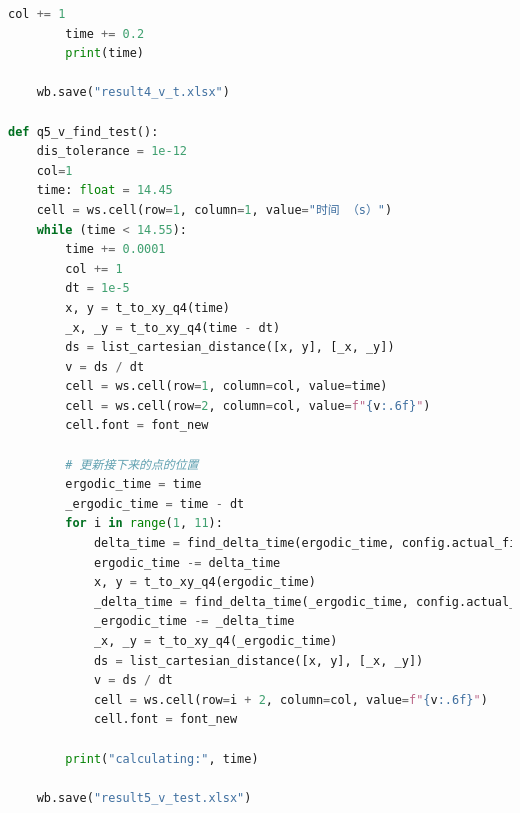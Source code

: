\documentclass[a4paper]{article}
\begin{document}
\begin{lstlisting}[language=python,columns=fullflexible,frame=shadowbox]
		col += 1
		time += 0.2
		print(time)
	
	wb.save("result4_v_t.xlsx")

def q5_v_find_test():
	dis_tolerance = 1e-12
	col=1
	time: float = 14.45
	cell = ws.cell(row=1, column=1, value="时间 （s）")
	while (time < 14.55):
		time += 0.0001
		col += 1
		dt = 1e-5
		x, y = t_to_xy_q4(time)
		_x, _y = t_to_xy_q4(time - dt)
		ds = list_cartesian_distance([x, y], [_x, _y])
		v = ds / dt
		cell = ws.cell(row=1, column=col, value=time)
		cell = ws.cell(row=2, column=col, value=f"{v:.6f}")
		cell.font = font_new
		
		# 更新接下来的点的位置
		ergodic_time = time
		_ergodic_time = time - dt
		for i in range(1, 11):
			delta_time = find_delta_time(ergodic_time, config.actual_fixed_distances[0 if i == 1 else 1], dis_tolerance)
			ergodic_time -= delta_time
			x, y = t_to_xy_q4(ergodic_time)
			_delta_time = find_delta_time(_ergodic_time, config.actual_fixed_distances[0 if i == 1 else 1], dis_tolerance)
			_ergodic_time -= _delta_time
			_x, _y = t_to_xy_q4(_ergodic_time)
			ds = list_cartesian_distance([x, y], [_x, _y])
			v = ds / dt
			cell = ws.cell(row=i + 2, column=col, value=f"{v:.6f}")
			cell.font = font_new
	
		print("calculating:", time)
	
	wb.save("result5_v_test.xlsx")

	\end{lstlisting}
 	
\end{document}
